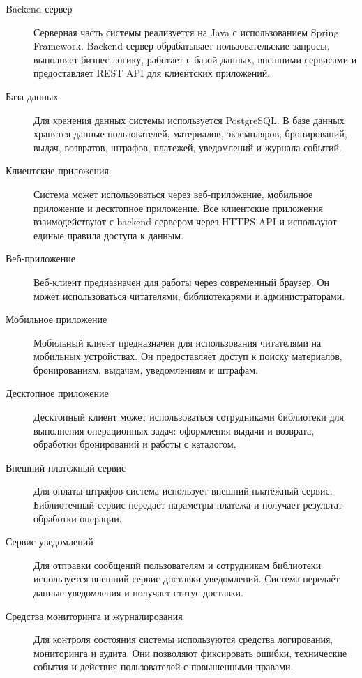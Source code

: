 \documentclass[12pt,a4paper]{article}
\begin{document}
	\begin{description}
		\item[Backend-сервер]
		Серверная часть системы реализуется на Java с использованием Spring Framework.
		Backend-сервер обрабатывает пользовательские запросы, выполняет бизнес-логику,
		работает с базой данных, внешними сервисами и предоставляет REST API для
		клиентских приложений.
		
		\item[База данных]
		Для хранения данных системы используется PostgreSQL. В базе данных хранятся
		данные пользователей, материалов, экземпляров, бронирований, выдач, возвратов,
		штрафов, платежей, уведомлений и журнала событий.
		
		\item[Клиентские приложения]
		Система может использоваться через веб-приложение, мобильное приложение и
		десктопное приложение. Все клиентские приложения взаимодействуют с backend-сервером
		через HTTPS API и используют единые правила доступа к данным.
		
		\item[Веб-приложение]
		Веб-клиент предназначен для работы через современный браузер. Он может
		использоваться читателями, библиотекарями и администраторами.
		
		\item[Мобильное приложение]
		Мобильный клиент предназначен для использования читателями на мобильных
		устройствах. Он предоставляет доступ к поиску материалов, бронированиям,
		выдачам, уведомлениям и штрафам.
		
		\item[Десктопное приложение]
		Десктопный клиент может использоваться сотрудниками библиотеки для выполнения
		операционных задач: оформления выдачи и возврата, обработки бронирований и
		работы с каталогом.
		
		\item[Внешний платёжный сервис]
		Для оплаты штрафов система использует внешний платёжный сервис. Библиотечный сервис
		передаёт параметры платежа и получает результат обработки операции.
		
		\item[Сервис уведомлений]
		Для отправки сообщений пользователям и сотрудникам библиотеки используется внешний сервис доставки уведомлений. Система передаёт данные уведомления и получает статус доставки.
		
		\item[Средства мониторинга и журналирования]
		Для контроля состояния системы используются средства логирования, мониторинга
		и аудита. Они позволяют фиксировать ошибки, технические события и действия
		пользователей с повышенными правами.
	\end{description}
	
\end{document}
